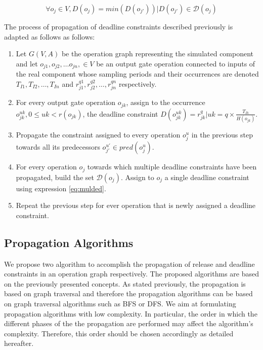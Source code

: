 \begin{equation}
\forall o_j \in V, D(o_j) = min(D(o_{j'})) | D(o_{j'}) \in \mathcal{D}(o_j) 
\label{eq:mulded}
\end{equation}

The process of propagation of deadline constraints described previously is adapted as follows as follows:

\begin{enumerate}
\item Let $G(V,A)$ be the operation graph representing the simulated component and let $o_{j1}, o_{j2}, \ldots o_{jn},\in  V$ be an output gate operation connected to inputs of the real component whose sampling periods and their occurrences are denoted $T_{I1}, T_{I2}, \ldots, T_{In}$ and $r_{j1}^{q1}, r_{j2}^{q2}, \ldots, r_{jn}^{qn}$ respectively.
\item For every output gate operation $o_{jk}$, assign to the occurrence $o_{jk}^{uk}, 0 \leq uk < r(o_{jk})$, the deadline constraint $D(o_{jk}^{uk}) = r_{jk}^q | uk = q \times \frac{T_{Ik}}{H(o_{jk})}$.
\item Propagate the constraint assigned to every operation $o_j^u$ in the previous step towards all its predecessors $o_{j'}^{u'} \in pred(o_j^u)$.
\item For every operation $o_j$ towards which multiple deadline constraints have been propagated, build the set $\mathcal{D}(o_j)$. Assign to $o_j$ a single deadline constraint using expression \ref{eq:mulded}.
\item Repeat the previous step for ever operation that is newly assigned a deadline constraint.
\end{enumerate}

\subsection{Propagation Algorithms}

We propose two algorithm to accomplish the propagation of release and deadline constraints in an operation graph respectively. The proposed algorithms are based on the previously presented concepts. As stated previously, the propagation is based on graph traversal and therefore the propagation algorithms can be based on graph traversal algorithms such as BFS or DFS. We aim at formulating propagation algorithms with low complexity. In particular, the order in which the different phases of the the propagation are performed may affect the algorithm's complexity. Therefore, this order should be chosen accordingly as detailed hereafter.

